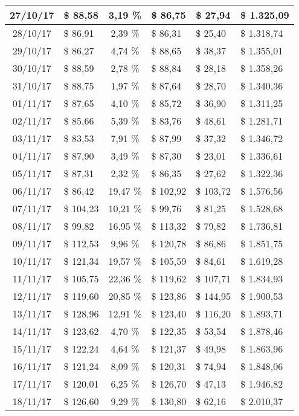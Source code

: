 \begin{center}
\begin{small}
\begin{longtable}{|c|l|c|l|l|l|}
27/10/17 & \$ 88,58 & 3,19 \% & \$ 86,75 & \$ 27,94 & \$ 1.325,09 \\ \hline
28/10/17 & \$ 86,91 & 2,39 \% & \$ 86,31 & \$ 25,40 & \$ 1.318,74 \\ \hline
29/10/17 & \$ 86,27 & 4,74 \% & \$ 88,65 & \$ 38,37 & \$ 1.355,01 \\ \hline
30/10/17 & \$ 88,59 & 2,78 \% & \$ 88,84 & \$ 28,18 & \$ 1.358,26 \\ \hline
31/10/17 & \$ 88,75 & 1,97 \% & \$ 87,64 & \$ 28,70 & \$ 1.340,36 \\ \hline
01/11/17 & \$ 87,65 & 4,10 \% & \$ 85,72 & \$ 36,90 & \$ 1.311,25 \\ \hline
02/11/17 & \$ 85,66 & 5,39 \% & \$ 83,76 & \$ 48,61 & \$ 1.281,71 \\ \hline
03/11/17 & \$ 83,53 & 7,91 \% & \$ 87,99 & \$ 37,32 & \$ 1.346,72 \\ \hline
04/11/17 & \$ 87,90 & 3,49 \% & \$ 87,30 & \$ 23,01 & \$ 1.336,61 \\ \hline
05/11/17 & \$ 87,31 & 2,32 \% & \$ 86,35 & \$ 27,62 & \$ 1.322,36 \\ \hline
06/11/17 & \$ 86,42 & 19,47 \% & \$ 102,92 & \$ 103,72 & \$ 1.576,56 \\ \hline
07/11/17 & \$ 104,23 & 10,21 \% & \$ 99,76 & \$ 81,25 & \$ 1.528,68 \\ \hline
08/11/17 & \$ 99,82 & 16,95 \% & \$ 113,32 & \$ 79,82 & \$ 1.736,81 \\ \hline
09/11/17 & \$ 112,53 & 9,96 \% & \$ 120,78 & \$ 86,86 & \$ 1.851,75 \\ \hline
10/11/17 & \$ 121,34 & 19,57 \% & \$ 105,59 & \$ 84,61 & \$ 1.619,28 \\ \hline
11/11/17 & \$ 105,75 & 22,36 \% & \$ 119,62 & \$ 107,71 & \$ 1.834,93 \\ \hline
12/11/17 & \$ 119,60 & 20,85 \% & \$ 123,86 & \$ 144,95 & \$ 1.900,53 \\ \hline
13/11/17 & \$ 128,96 & 12,91 \% & \$ 123,40 & \$ 116,20 & \$ 1.893,71 \\ \hline
14/11/17 & \$ 123,62 & 4,70 \% & \$ 122,35 & \$ 53,54 & \$ 1.878,46 \\ \hline
15/11/17 & \$ 122,24 & 4,64 \% & \$ 121,37 & \$ 49,98 & \$ 1.863,96 \\ \hline
16/11/17 & \$ 121,24 & 8,09 \% & \$ 120,31 & \$ 74,94 & \$ 1.848,06 \\ \hline
17/11/17 & \$ 120,01 & 6,25 \% & \$ 126,70 & \$ 47,13 & \$ 1.946,82 \\ \hline
18/11/17 & \$ 126,60 & 9,29 \% & \$ 130,80 & \$ 62,16 & \$ 2.010,37 \\ \hline

\end{longtable}
\end{small}
\end{center}

